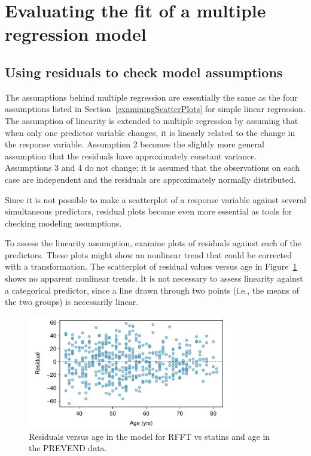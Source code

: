 \newpage

\section{Evaluating the fit of a multiple regression model}

\subsection{Using residuals to check model assumptions}

The assumptions behind multiple regression are essentially the same as the four assumptions listed in Section~\ref{examiningScatterPlots} for simple linear regression. The assumption of linearity is extended to multiple regression by assuming that when only one predictor variable changes, it is linearly related to the change in the response variable.  Assumption 2 becomes the slightly more general assumption that the residuals have approximately constant variance. Assumptions 3 and 4 do not change; it is assumed that the observations on each case are independent and the residuals are approximately normally distributed.

Since it is not possible to make a scatterplot of a response variable against several simultaneous predictors, residual plots become even more essential as tools for checking modeling assumptions. 

To assess the linearity assumption, examine plots of residuals against each of the predictors. These plots might show an nonlinear trend that could be corrected with a transformation. The scatterplot of residual values versus age in Figure~\ref{prevendStatinAgeResidPlot} shows no apparent nonlinear trends. It is not necessary to assess linearity against a categorical predictor, since a line drawn through two points (i.e., the means of the two groups) is necessarily linear.

\begin{figure}[h!]
	\centering
	\includegraphics[width=0.8\textwidth]
	{ch_multiple_linear_regression_oi_biostat/figures/prevendStatinAgeResidPlot/prevendStatinAgeResidPlot.pdf}
	\caption{Residuals versus age in the model for RFFT vs statins and age in the PREVEND data.}
	\label{prevendStatinAgeResidPlot}
\end{figure}

